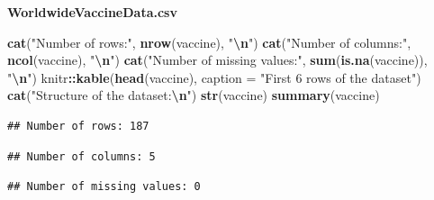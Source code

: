 \documentclass[
]{article}
\newenvironment{Shaded}{\begin{snugshade}}{\end{snugshade}}
\newcommand{\AttributeTok}[1]{\textcolor[rgb]{0.13,0.29,0.53}{#1}}
\newcommand{\FunctionTok}[1]{\textcolor[rgb]{0.13,0.29,0.53}{\textbf{#1}}}
\newcommand{\NormalTok}[1]{#1}
\newcommand{\SpecialCharTok}[1]{\textcolor[rgb]{0.81,0.36,0.00}{\textbf{#1}}}
\newcommand{\StringTok}[1]{\textcolor[rgb]{0.31,0.60,0.02}{#1}}
\begin{document}
\vspace{1cm}

\textbf{WorldwideVaccineData.csv}

\begin{Shaded}
\begin{Highlighting}[]
\FunctionTok{cat}\NormalTok{(}\StringTok{"Number of rows:"}\NormalTok{, }\FunctionTok{nrow}\NormalTok{(vaccine), }\StringTok{"}\SpecialCharTok{\textbackslash{}n}\StringTok{"}\NormalTok{)}
\FunctionTok{cat}\NormalTok{(}\StringTok{"Number of columns:"}\NormalTok{, }\FunctionTok{ncol}\NormalTok{(vaccine), }\StringTok{"}\SpecialCharTok{\textbackslash{}n}\StringTok{"}\NormalTok{)}
\FunctionTok{cat}\NormalTok{(}\StringTok{"Number of missing values:"}\NormalTok{, }\FunctionTok{sum}\NormalTok{(}\FunctionTok{is.na}\NormalTok{(vaccine)), }\StringTok{"}\SpecialCharTok{\textbackslash{}n}\StringTok{"}\NormalTok{)}
\NormalTok{knitr}\SpecialCharTok{::}\FunctionTok{kable}\NormalTok{(}\FunctionTok{head}\NormalTok{(vaccine), }\AttributeTok{caption =} \StringTok{"First 6 rows of the dataset"}\NormalTok{)}
\FunctionTok{cat}\NormalTok{(}\StringTok{"Structure of the dataset:}\SpecialCharTok{\textbackslash{}n}\StringTok{"}\NormalTok{)}
\FunctionTok{str}\NormalTok{(vaccine)}
\FunctionTok{summary}\NormalTok{(vaccine)}
\end{Highlighting}
\end{Shaded}

\begin{verbatim}
## Number of rows: 187
\end{verbatim}

\begin{verbatim}
## Number of columns: 5
\end{verbatim}

\begin{verbatim}
## Number of missing values: 0
\end{verbatim}
\end{document}
